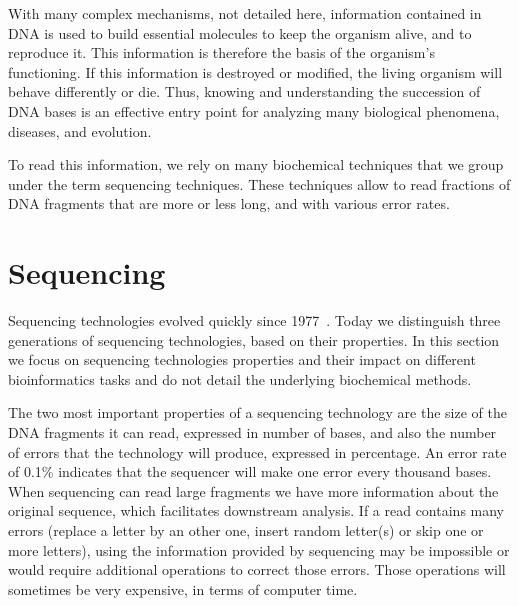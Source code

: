 \documentclass[./main.tex]{subfiles}
\begin{document}
With many complex mechanisms, not detailed here, information contained in DNA is used to build essential molecules to keep the organism alive, and to reproduce it. %
This information is therefore the basis of the organism's functioning. If this information is destroyed or modified, the living organism will behave differently or die. Thus, knowing and understanding the succession of DNA bases is an effective entry point for analyzing many biological phenomena, diseases, and evolution. %

To read this information, we rely on many biochemical techniques that we group under the term sequencing techniques. These techniques allow to read fractions of DNA fragments that are more or less long, and with various error rates. %

\section{Sequencing} \label{section:introduction:sequencing}

Sequencing technologies evolved quickly since 1977~\cite{sanger_sequencing}. Today we distinguish three generations of sequencing technologies, based on their properties.
In this section we focus on sequencing technologies properties and their impact on different bioinformatics tasks and do not detail the underlying biochemical methods.%

The two most important properties of a sequencing technology are the size of the DNA fragments it can read, expressed in number of bases, and also the number of errors that the technology will produce, expressed in percentage. An error rate of 0.1\% indicates that the sequencer will make one error every thousand bases.
When sequencing can read large fragments we have more information about the original sequence, which facilitates downstream analysis.
If a read contains many errors (replace a letter by an other one, insert random letter(s) or skip one or more letters), using the information provided by sequencing may be impossible or would require additional operations to correct those errors. Those operations will sometimes be very expensive, in terms of computer time.
\end{document}
